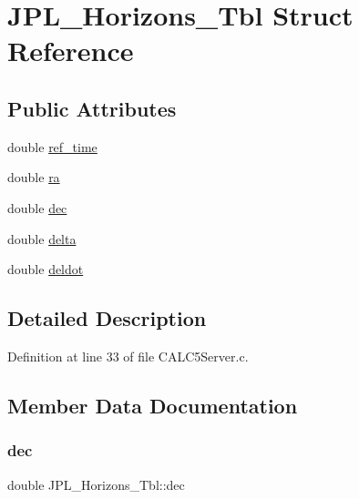 \hypertarget{struct_j_p_l___horizons___tbl}{}\section{J\+P\+L\+\_\+\+Horizons\+\_\+\+Tbl Struct Reference}
\label{struct_j_p_l___horizons___tbl}
\subsection*{Public Attributes}
\begin{DoxyCompactItemize}
\item 
double \hyperlink{struct_j_p_l___horizons___tbl_abd8ee518e5a45192fea57fbcd16708b1}{ref\+\_\+time}
\item 
double \hyperlink{struct_j_p_l___horizons___tbl_abc262f3e856529b24a76210202778468}{ra}
\item 
double \hyperlink{struct_j_p_l___horizons___tbl_ad07e42864e203207f89c0796ef8a4ca5}{dec}
\item 
double \hyperlink{struct_j_p_l___horizons___tbl_a966b408063d870bfedf6ae7c6cccbd48}{delta}
\item 
double \hyperlink{struct_j_p_l___horizons___tbl_af63b7627876452b4c30a07395822529b}{deldot}
\end{DoxyCompactItemize}


\subsection{Detailed Description}


Definition at line 33 of file C\+A\+L\+C5\+Server.\+c.



\subsection{Member Data Documentation}
\mbox{\label{struct_j_p_l___horizons___tbl_ad07e42864e203207f89c0796ef8a4ca5}} 
\subsubsection{\texorpdfstring{dec}{dec}}
{\footnotesize\ttfamily double J\+P\+L\+\_\+\+Horizons\+\_\+\+Tbl\+::dec}



